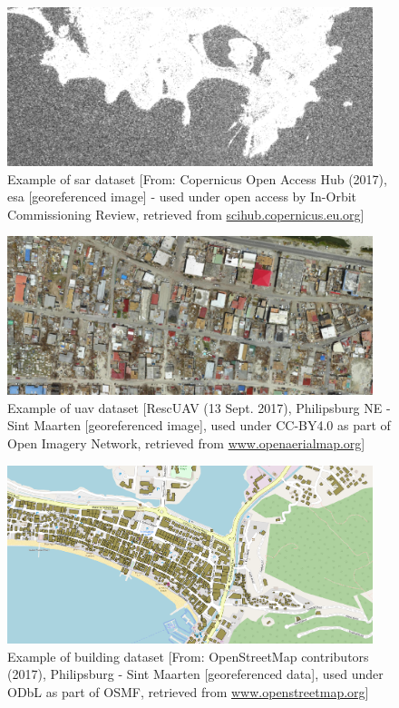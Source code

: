 \begin{figure}[H]
	\centering
	\captionsetup{justification=raggedright,singlelinecheck=false}
	\includegraphics[width=0.95\textwidth]{figs/sar.png}
	\caption{\footnotesize{Example of \ac{sar} dataset [From: Copernicus Open Access Hub (2017), \ac{esa} [georeferenced image] - used under open access by In-Orbit Commissioning Review, retrieved from \url{scihub.copernicus.eu.org}]}}
	\label{fig:sar}
\end{figure}
\begin{figure}[H]
	\centering
	\captionsetup{justification=raggedright,singlelinecheck=false}
	\includegraphics[width=0.95\textwidth]{figs/uav.png}
	\caption{\footnotesize{Example of \ac{uav} dataset [RescUAV (13 Sept. 2017), Philipsburg NE - Sint Maarten [georeferenced image], used under CC-BY4.0 as part of Open Imagery Network, retrieved from \url{www.openaerialmap.org}]}}
	\label{fig:uav}
\end{figure}
\begin{figure}[H]
	\centering
	\captionsetup{justification=raggedright,singlelinecheck=false}
	\includegraphics[width=0.95\textwidth]{figs/building.png}
	\caption{\footnotesize{Example of building dataset [From: OpenStreetMap contributors (2017), Philipsburg - Sint Maarten [georeferenced data], used under ODbL as part of OSMF, retrieved from \url{www.openstreetmap.org}]}}
	\label{fig:build}
\end{figure}
